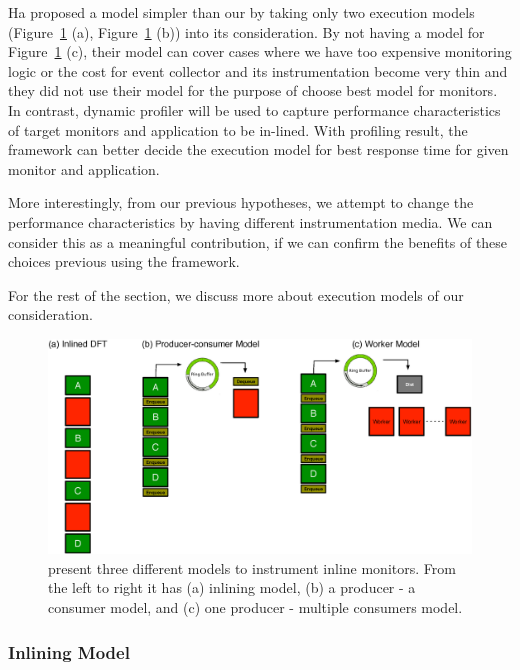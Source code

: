 Ha \etal\cite{cab:oopsala2009} proposed a model simpler than our by taking only
two execution models (Figure~\ref{fig:model0} (a), Figure~\ref{fig:model0} (b))
into its consideration. By not having a model for Figure~\ref{fig:model0} (c),
their model can cover cases where we have too expensive monitoring logic or the
cost for event collector and its instrumentation become very thin and they did
not use their model for the purpose of choose best model for monitors. In
contrast, dynamic profiler will be used to capture performance characteristics
of target monitors and application to be in-lined. With profiling result, the
framework can better decide the execution model for best response time for
given monitor and application.

More interestingly, from our previous hypotheses, we attempt to change the
performance characteristics by having different instrumentation media. We can
consider this as a meaningful contribution, if we can confirm the benefits of
these choices previous using the framework.

For the rest of the section, we discuss more about execution models of our
consideration.

\begin{figure}[tb]
    \centering
    \includegraphics[width=0.90\linewidth]{figs/model0.eps}

    \caption{present three different models to instrument inline monitors. From
    the left to right it has (a) inlining model, (b) a producer - a consumer
    model, and (c) one producer - multiple consumers model.\label{fig:model0}}

\end{figure}

\subsubsection{Inlining Model}

